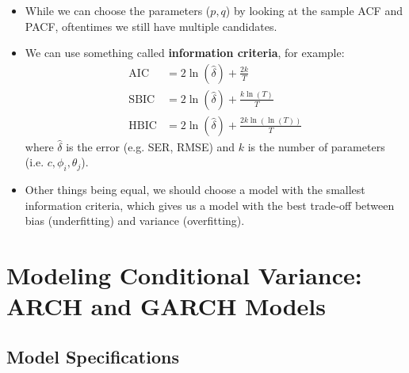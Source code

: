 \documentclass[notitlepage]{article}
\begin{document}
\begin{itemize}
    \item While we can choose the parameters (\(p,q\)) by looking at the sample ACF and PACF, oftentimes we still have multiple candidates.
    \item We can use something called \textbf{information criteria}, for example:
    \begin{align*}
        \text{AIC} &= 2\ln(\hat{\delta}) + \frac{2k}{T} \\
        \text{SBIC} &= 2\ln(\hat{\delta}) + \frac{k\ln(T)}{T} \\
        \text{HBIC} &= 2\ln(\hat{\delta}) + \frac{2k\ln(\ln(T))}{T}
    \end{align*}
    where \(\hat{\delta}\) is the error (e.g. SER, RMSE) and \(k\) is the number of parameters (i.e. \(c, \phi_i, \theta_j\)).
    \item Other things being equal, we should choose a model with the smallest information criteria, which gives us a model with the best trade-off between bias (underfitting) and variance (overfitting).
\end{itemize}

\section{Modeling Conditional Variance: ARCH and GARCH Models}

\subsection{Model Specifications}
\end{document}
